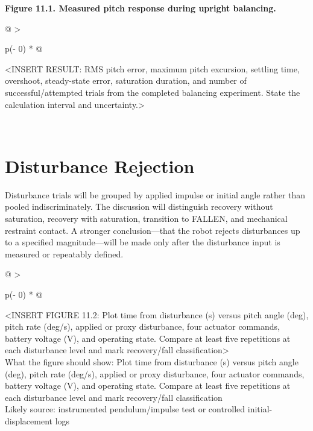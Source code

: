 \begin{center}\singlespacing
{}
\textbf{Figure 11.1. Measured pitch response during upright balancing.}
\end{center}

\begin{longtable}[]{@{}
  >{\raggedright\arraybackslash}p{(\columnwidth - 0\tabcolsep) * }@{}}
\toprule\noalign{}
\begin{minipage}[b]{\linewidth}\raggedright
\textless INSERT RESULT: RMS pitch error, maximum pitch excursion,
settling time, overshoot, steady-state error, saturation duration, and
number of successful\slash{}attempted trials from the completed balancing
experiment. State the calculation interval and
uncertainty.\textgreater{}
\end{minipage} \\
\midrule\noalign{}
\endhead
\bottomrule\noalign{}
\endlastfoot
\end{longtable}

\section{Disturbance Rejection}\label{disturbance-rejection}

Disturbance trials will be grouped by applied impulse or initial angle
rather than pooled indiscriminately. The discussion will distinguish
recovery without saturation, recovery with saturation, transition to
FALLEN, and mechanical restraint contact. A stronger conclusion---that
the robot rejects disturbances up to a specified magnitude---will be
made only after the disturbance input is measured or repeatably defined.

\begin{longtable}[]{@{}
  >{\raggedright\arraybackslash}p{(\columnwidth - 0\tabcolsep) * }@{}}
\toprule\noalign{}
\begin{minipage}[b]{\linewidth}\raggedright
\textless INSERT FIGURE 11.2: Plot time from disturbance (s) versus
pitch angle (deg), pitch rate (deg\slash{}s), applied or proxy disturbance,
four actuator commands, battery voltage (V), and operating state.
Compare at least five repetitions at each disturbance level and mark
recovery\slash{}fall classification\textgreater{}\\
What the figure should show: Plot time from disturbance (s) versus pitch
angle (deg), pitch rate (deg\slash{}s), applied or proxy disturbance, four
actuator commands, battery voltage (V), and operating state. Compare at
least five repetitions at each disturbance level and mark recovery\slash{}fall
classification\\
Likely source: instrumented pendulum\slash{}impulse test or controlled
initial-displacement logs\strut
\end{minipage} \\
\midrule\noalign{}
\endhead
\bottomrule\noalign{}
\endlastfoot
\end{longtable}

